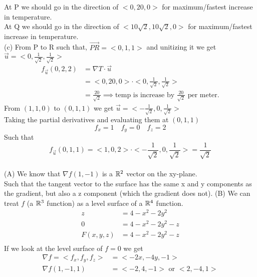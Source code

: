 \documentclass{article}
\begin{document}
At P we should go in the direction of $<0,20,0>$ for maximum/fastest increase in temperature.
\\ At Q we should go in the direction of $<10\sqrt{2},10\sqrt{2},0>$ for maximum/fastest increase in temperature.
\\ (c) From P to R such that, $\vec{PR} = <0,1,1>$ and unitizing it we get $\vec{u} = <0,\frac{1}{\sqrt{2}},\frac{1}{\sqrt{2}}>$
\begin{align*}
  f_{\vec{u}} (0,2,2) &= \nabla T \cdot \vec{u} \\
  &= <0,20,0> \cdot <0,\frac{1}{\sqrt{2}},\frac{1}{\sqrt{2}}> \\
  &= \frac{20}{\sqrt{2}} \implies \text{temp is increase by } \frac{20}{\sqrt{2}} \text{ per meter.}
\end{align*}
\sol From $(1,1,0)$ to $(0,1,1)$ we get $\vec{u} = <-\frac{1}{\sqrt{2}},0,\frac{1}{\sqrt{2}}>$
\\Taking the partial derivatives and evaluating them at $(0,1,1)$
$$ f_x = 1 \quad f_y = 0 \quad f_z = 2$$
Such that
$$ f_{\vec{u}} (0,1,1) = <1,0,2> \cdot <-\frac{1}{\sqrt{2}},0,\frac{1}{\sqrt{2}}> = \boxed{\frac{1}{\sqrt{2}}}$$
\sol
\\ (A) We know that $\nabla f (1,-1)$ is a $\RR^2$ vector on the xy-plane.
\\ Such that the tangent vector to the surface has the same x and y components as the gradient, but also a z component (which the gradient does not).
\double (B) We can treat $f$ (a $\RR^3$ function) as a level surface of a $\RR^4$ function.
\begin{align*}
  z &= 4-x^2-2y^2 \\
  0 &= 4-x^2-2y^2-z \\
  F(x,y,z) &= 4-x^2-2y^2-z \\
\end{align*}
If we look at the level surface of $f = 0$ we get
\begin{align*}
  \nabla f = <f_x, f_y, f_z> &= <-2x, -4y, -1> \\
  \nabla f (1,-1,1) &= <-2,4,-1> \text{ or } <2,-4,1>\\
\end{align*}
\end{document}
